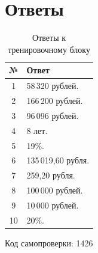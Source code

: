 \documentclass[a4paper,12pt]{article}
\begin{document}
\clearpage
\section{Ответы}

\begin{table}[ht]
\centering
\caption{Ответы к тренировочному блоку}
\begin{tabularx}{\linewidth}{@{}cX@{}}
\toprule
№ & Ответ \\
\midrule
1 & 58\,320 рублей. \\
2 & 166\,200 рублей. \\
3 & 96\,096 рублей. \\
4 & 8 лет. \\
5 & 19\%. \\
6 & 135\,019{,}60 рубля. \\
7 & 259{,}20 рубля. \\
8 & 100\,000 рублей. \\
9 & 10\,000 рублей. \\
10 & 20\%. \\
\bottomrule
\end{tabularx}
\end{table}

\vfill
\begin{center}
\textcolor{softgray}{Код самопроверки: 1426}
\end{center}
\end{document}
